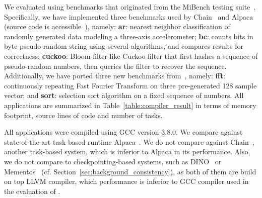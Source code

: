 We evaluated \sys using benchmarks that originated from the MiBench testing suite~\cite{mibench,hicks_mibench2_2016}. Specifically, we have implemented three benchmarks used by Chain~\cite{chain} and Alpaca~\cite{alpaca} (source code is accessible~\cite{coala_website}), namely: \textbf{ar}: nearest neighbor classification of randomly generated data modeling a three-axis accelerometer; \textbf{bc}: counts bits in byte pseudo-random string using several algorithms, and compares results for correctness; \textbf{cuckoo}: Bloom-filter-like Cuckoo filter that first hashes a sequence of pseudo-random numbers, then queries the filter to recover the sequence. Additionally, we have ported three new benchmarks from~\cite{mibench}, namely: \textbf{fft}: continuously repeating Fast Fourier Transform on three pre-generated 128 sample vector; and \textbf{sort}: selection sort algorithm on a fixed sequence of numbers.  All applications are summarized in Table~\ref{table:compiler_result} in terms of memory footprint, source lines of code and number of tasks. 

All applications were compiled using GCC version 3.8.0.  We compare \sys against state-of-the-art task-based runtime Alpaca~\cite{alpaca}. We do not compare \sys against Chain~\cite{chain}, another task-based system, which is inferior to Alpaca in its performance. Also, we do not compare \sys to checkpointing-based systems, such as DINO~\cite{dino} or Mementos~\cite{mementos} (cf. Section~\ref{sec:background_consistency}), as both of them are build on top LLVM compiler, which performance is inferior to GCC compiler used in the evaluation of \sys {}.